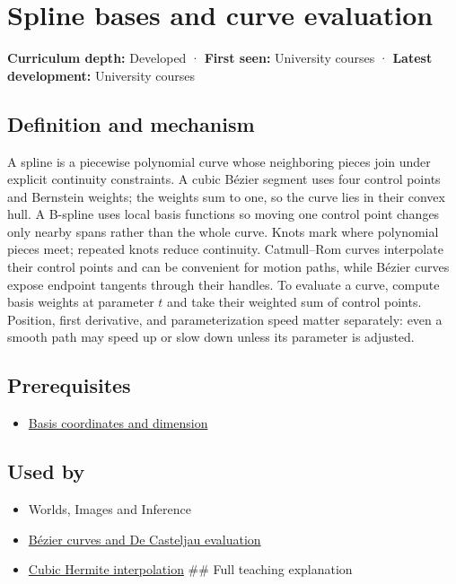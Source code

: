 \hypertarget{appendix-f28eeec97a3d}{}\label{referencestart:appendix-f28eeec97a3d}
\section{Spline bases and curve evaluation}\label{appendix-f28eeec97a3d-spline-bases-and-curve-evaluation}

\textbf{Curriculum depth:} Developed · \textbf{First seen:} University courses · \textbf{Latest development:} University courses

\subsection{Definition and mechanism}\label{appendix-f28eeec97a3d-definition-and-mechanism}

A spline is a piecewise polynomial curve whose neighboring pieces join under explicit continuity constraints. A cubic Bézier segment uses four control points and Bernstein weights; the weights sum to one, so the curve lies in their convex hull. A B-spline uses local basis functions so moving one control point changes only nearby spans rather than the whole curve. Knots mark where polynomial pieces meet; repeated knots reduce continuity. Catmull--Rom curves interpolate their control points and can be convenient for motion paths, while Bézier curves expose endpoint tangents through their handles. To evaluate a curve, compute basis weights at parameter \(t\) and take their weighted sum of control points. Position, first derivative, and parameterization speed matter separately: even a smooth path may speed up or slow down unless its parameter is adjusted.

\subsection{Prerequisites}\label{appendix-f28eeec97a3d-prerequisites}

\begin{itemize}
\tightlist
\item
  \hyperref[appendix-ce0341f7ea0d]{Basis coordinates and dimension}
\end{itemize}

\subsection{Used by}\label{appendix-f28eeec97a3d-used-by}

\begin{itemize}
\item
  {Worlds, Images and Inference}
\item
  \hyperref[appendix-ddbec701898c]{Bézier curves and De Casteljau evaluation}
\item
  \hyperref[appendix-db3aef8f2fd6]{Cubic Hermite interpolation} \#\# Full teaching explanation
\end{itemize}

